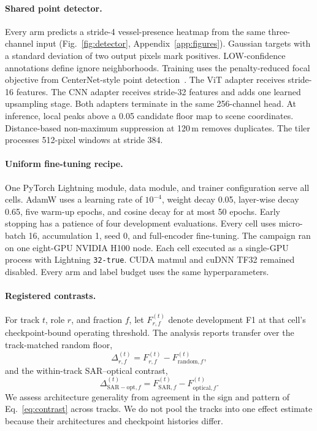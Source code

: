 \paragraph{Shared point detector.}
Every arm predicts a stride-4 vessel-presence heatmap from the same
three-channel input (Fig.~\ref{fig:detector}, Appendix~\ref{app:figures}).
Gaussian targets with a standard deviation of two output pixels mark
positives. LOW-confidence annotations define ignore neighborhoods. Training
uses the penalty-reduced focal objective from CenterNet-style point
detection~\cite{zhou2019objects}. The ViT adapter receives stride-16
features. The CNN adapter receives stride-32 features and adds one learned
upsampling stage. Both adapters terminate in the same 256-channel head. At
inference, local peaks above a 0.05 candidate floor map to scene coordinates.
Distance-based non-maximum suppression at 120\,m removes duplicates. The
tiler processes 512-pixel windows at stride 384.

\paragraph{Uniform fine-tuning recipe.}
One PyTorch Lightning module, data module, and trainer configuration serve
all cells. AdamW uses a learning rate of $10^{-4}$, weight decay 0.05,
layer-wise decay 0.65, five warm-up epochs, and cosine decay for at most 50
epochs. Early stopping has a patience of four development evaluations. Every
cell uses micro-batch 16, accumulation 1, seed 0, and full-encoder
fine-tuning. The campaign ran on one eight-GPU NVIDIA H100 node. Each cell
executed as a single-GPU process with Lightning \texttt{32-true}. CUDA matmul
and cuDNN TF32 remained disabled. Every arm and label budget uses the same
hyperparameters.

\paragraph{Registered contrasts.}
For track $t$, role $r$, and fraction $f$, let $F^{(t)}_{r,f}$ denote
development F1 at that cell's checkpoint-bound operating threshold. The
analysis reports transfer over the track-matched random floor,
\begin{equation}
\Delta^{(t)}_{r,f} = F^{(t)}_{r,f} - F^{(t)}_{\mathrm{random},f},
\label{eq:gain}
\end{equation}
and the within-track SAR--optical contrast,
\begin{equation}
\Delta^{(t)}_{\mathrm{SAR-opt},f} =
F^{(t)}_{\mathrm{SAR},f} - F^{(t)}_{\mathrm{optical},f}.
\label{eq:contrast}
\end{equation}
We assess architecture generality from agreement in the sign and pattern of
Eq.~\eqref{eq:contrast} across tracks. We do not pool the tracks into one
effect estimate because their architectures and checkpoint histories differ.
